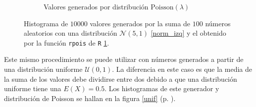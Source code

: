 \documentclass[paper=leter, fontsize=11pt]{scrartcl}
\numberwithin{equation}{section}		%
\numberwithin{figure}{section}			%
\numberwithin{table}{section}				%
\begin{document}
\begin{figure}
\begin{subfigure}{0.5\textwidth}
        \caption{Valores generados por distribución $\text{Poisson}(\lambda)$}
        \label{norm_der}
    \end{subfigure}
    \caption{Histograma de $10000$ valores generados por la suma de $100$ números aleatorios con una distribución $\mathcal{N}(5, 1)$ \ref{norm_izq} y el obtenido por la función \texttt{rpois} de \texttt{R} \ref{norm_der}.}
    \label{norm}
\end{figure}

Este mismo procedimiento se puede utilizar con números generados a partir de una distribución uniforme $\mathcal{U}(0, 1)$. La diferencia en este caso es que la media de la suma de los valores debe dividirse entre dos debido a que una distribución uniforme tiene una $E(X) = 0.5$. Los histogramas de este generador y distribución de Poisson se hallan en la figura \ref{unif} (p. \pageref{unif}).
\end{document}
